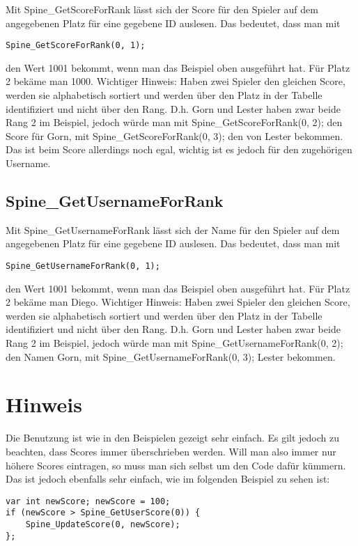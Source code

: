 \documentclass{article}
\begin{document}
Mit Spine\_GetScoreForRank lässt sich der Score für den Spieler auf dem angegebenen Platz für eine gegebene ID auslesen. Das bedeutet, dass man mit

\begin{lstlisting}
Spine_GetScoreForRank(0, 1);
\end{lstlisting}

den Wert 1001 bekommt, wenn man das Beispiel oben ausgeführt hat. Für Platz 2 bekäme man 1000. Wichtiger Hinweis: Haben zwei Spieler den gleichen Score, werden sie alphabetisch sortiert und werden über den Platz in der Tabelle identifiziert und nicht über den Rang. D.h. Gorn und Lester haben zwar beide Rang 2 im Beispiel, jedoch würde man mit Spine\_GetScoreForRank(0, 2); den Score für Gorn, mit Spine\_GetScoreForRank(0, 3); den von Lester bekommen. Das ist beim Score allerdings noch egal, wichtig ist es jedoch für den zugehörigen Username.

\subsection{Spine\_GetUsernameForRank}

Mit Spine\_GetUsernameForRank lässt sich der Name für den Spieler auf dem angegebenen Platz für eine gegebene ID auslesen. Das bedeutet, dass man mit

\begin{lstlisting}
Spine_GetUsernameForRank(0, 1);
\end{lstlisting}

den Wert 1001 bekommt, wenn man das Beispiel oben ausgeführt hat. Für Platz 2 bekäme man Diego. Wichtiger Hinweis: Haben zwei Spieler den gleichen Score, werden sie alphabetisch sortiert und werden über den Platz in der Tabelle identifiziert und nicht über den Rang. D.h. Gorn und Lester haben zwar beide Rang 2 im Beispiel, jedoch würde man mit Spine\_GetUsernameForRank(0, 2); den Namen Gorn, mit Spine\_GetUsernameForRank(0, 3); Lester bekommen.

\section{Hinweis}

Die Benutzung ist wie in den Beispielen gezeigt sehr einfach. Es gilt jedoch zu beachten, dass Scores immer überschrieben werden. Will man also immer nur höhere Scores eintragen, so muss man sich selbst um den Code dafür kümmern. Das ist jedoch ebenfalls sehr einfach, wie im folgenden Beispiel zu sehen ist:

\begin{lstlisting}
var int newScore; newScore = 100;
if (newScore > Spine_GetUserScore(0)) {
	Spine_UpdateScore(0, newScore);
};
\end{lstlisting}
\end{document}
